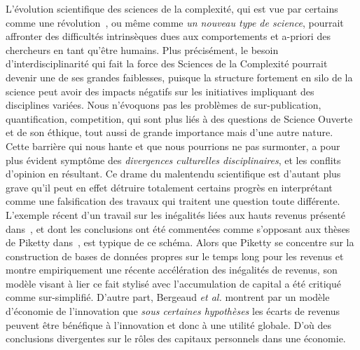 {}{
L'évolution scientifique des sciences de la complexité, qui est vue par certains comme une révolution~\cite{colander2003complexity}, ou même comme \emph{un nouveau type de science}, pourrait affronter des difficultés intrinsèques dues aux comportements et a-priori des chercheurs en tant qu'être humains. 
 Plus précisément, le besoin d'interdisciplinarité qui fait la force des Sciences de la Complexité pourrait devenir une de ses grandes faiblesses, puisque la structure fortement en silo de la science peut avoir des impacts négatifs sur les initiatives impliquant des disciplines variées. Nous n'évoquons pas les problèmes de sur-publication, quantification, competition, qui sont plus liés à des questions de Science Ouverte et de son éthique, tout aussi de grande importance mais d'une autre nature. Cette barrière qui nous hante et que nous pourrions ne pas surmonter, a pour plus évident symptôme des \emph{divergences culturelles disciplinaires}, et les conflits d'opinion en résultant. Ce drame du malentendu scientifique est d'autant plus grave qu'il peut en effet détruire totalement certains progrès en interprétant comme une falsification des travaux qui traitent une question toute différente. L'exemple récent d'un travail sur les inégalités liées aux hauts revenus présenté dans~\cite{aghion2015innovation}, et dont les conclusions ont été commentées comme s'opposant aux thèses de Piketty dans~\cite{piketty2013capital}, est typique de ce schéma. Alors que Piketty se concentre sur la construction de bases de données propres sur le temps long pour les revenus et montre empiriquement une récente accélération des inégalités de revenus, son modèle visant à lier ce fait stylisé avec l'accumulation de capital a été critiqué comme sur-simplifié. D'autre part, Bergeaud \textit{et al.} montrent par un modèle d'économie de l'innovation que \emph{sous certaines hypothèses} les écarts de revenus peuvent être bénéfique à l'innovation et donc à une utilité globale. D'où des conclusions divergentes sur le rôles des capitaux personnels dans une économie. 
}
